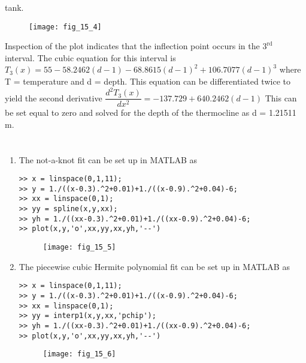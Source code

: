 \documentclass[../main.tex]{subfiles}
\begin{document}
\begin{enumerate}[label=\bfseries(\alph*)]
tank. 
	\bigbreak
	\begin{figure}[H]
		\texttt{[image: fig\_15\_4]}
		\label{fig:fig_15_4}
	\end{figure}
	\bigbreak
Inspection of the plot indicates that the inflection point occurs in the $3^{\text {rd }}$ interval. The cubic equation for this interval is
	\bigbreak
$T_{3}(x)=55-58.2462(d-1)-68.8615(d-1)^{2}+106.7077(d-1)^{3}$
	\bigbreak
where T = temperature and d = depth. This equation can be differentiated twice to yield the
second derivative
	\bigbreak
$\dfrac{d^{2} T_{3}(x)}{d x^{2}}=-137.729+640.2462(d-1)$
	\bigbreak
This can be set equal to zero and solved for the depth of the thermocline as d = 1.21511 m.
	\bigbreak
\end{enumerate}


\section{}
\begin{enumerate}[label=\bfseries(\alph*)]
\item The not-a-knot fit can be set up in MATLAB as
\begin{lstlisting}[numbers=none]
>> x = linspace(0,1,11);
>> y = 1./((x-0.3).^2+0.01)+1./((x-0.9).^2+0.04)-6;
>> xx = linspace(0,1);
>> yy = spline(x,y,xx);
>> yh = 1./((xx-0.3).^2+0.01)+1./((xx-0.9).^2+0.04)-6;
>> plot(x,y,'o',xx,yy,xx,yh,'--') 
\end{lstlisting}
	\bigbreak
	\begin{figure}[H]
		\texttt{[image: fig\_15\_5]}
		\label{fig:fig_15_5}
	\end{figure}
	\bigbreak
\item The piecewise cubic Hermite polynomial fit can be set up in MATLAB as 
	\bigbreak
\begin{lstlisting}[numbers=none]
>> x = linspace(0,1,11);
>> y = 1./((x-0.3).^2+0.01)+1./((x-0.9).^2+0.04)-6;
>> xx = linspace(0,1);
>> yy = interp1(x,y,xx,'pchip');
>> yh = 1./((xx-0.3).^2+0.01)+1./((xx-0.9).^2+0.04)-6;
>> plot(x,y,'o',xx,yy,xx,yh,'--')
\end{lstlisting}
	\begin{figure}[H]
		\texttt{[image: fig\_15\_6]}
		\label{fig:fig_15_6}
	\end{figure}
	\bigbreak
\end{enumerate}
\end{document}
